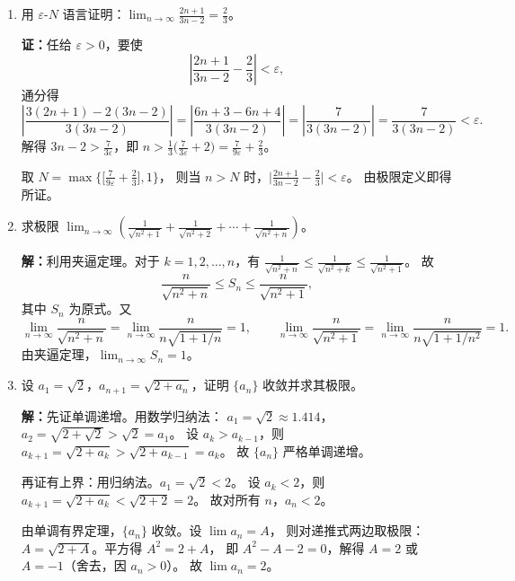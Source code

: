 \documentclass[12pt,a4paper]{ctexart}
\begin{document}
\begin{enumerate}[leftmargin=*,label=\arabic*.,start=4]
  \item 用 $\varepsilon$-$N$ 语言证明：$\displaystyle\lim_{n\to\infty}\frac{2n+1}{3n-2} = \frac{2}{3}$。

    \textbf{证：}任给 $\varepsilon > 0$，要使
    \[
    \left|\frac{2n+1}{3n-2} - \frac{2}{3}\right| < \varepsilon,
    \]
    通分得
    \[
    \left|\frac{3(2n+1) - 2(3n-2)}{3(3n-2)}\right|
    = \left|\frac{6n+3-6n+4}{3(3n-2)}\right|
    = \left|\frac{7}{3(3n-2)}\right|
    = \frac{7}{3(3n-2)} < \varepsilon.
    \]
    解得 $3n-2 > \frac{7}{3\varepsilon}$，即 $n > \frac{1}{3}\bigl(\frac{7}{3\varepsilon}+2\bigr)
    = \frac{7}{9\varepsilon} + \frac{2}{3}$。

    取 $N = \max\bigl\{\bigl[\frac{7}{9\varepsilon}+\frac{2}{3}\bigr], 1\bigr\}$，
    则当 $n > N$ 时，$\bigl|\frac{2n+1}{3n-2} - \frac{2}{3}\bigr| < \varepsilon$。
    由极限定义即得所证。

  \item 求极限 $\displaystyle\lim_{n\to\infty}\left(\frac{1}{\sqrt{n^2+1}} + \frac{1}{\sqrt{n^2+2}} + \cdots + \frac{1}{\sqrt{n^2+n}}\right)$。

    \textbf{解：}利用夹逼定理。对于 $k = 1,2,\dots,n$，有
    $\frac{1}{\sqrt{n^2+n}} \le \frac{1}{\sqrt{n^2+k}} \le \frac{1}{\sqrt{n^2+1}}$。
    故
    \[
    \frac{n}{\sqrt{n^2+n}} \le S_n \le \frac{n}{\sqrt{n^2+1}},
    \]
    其中 $S_n$ 为原式。又
    \[
    \lim_{n\to\infty}\frac{n}{\sqrt{n^2+n}} = \lim_{n\to\infty}\frac{n}{n\sqrt{1+1/n}} = 1,
    \qquad
    \lim_{n\to\infty}\frac{n}{\sqrt{n^2+1}} = \lim_{n\to\infty}\frac{n}{n\sqrt{1+1/n^2}} = 1.
    \]
    由夹逼定理，$\lim_{n\to\infty} S_n = 1$。

  \item 设 $a_1 = \sqrt{2}$，$a_{n+1} = \sqrt{2+a_n}$，证明 $\{a_n\}$ 收敛并求其极限。

    \textbf{解：}先证单调递增。用数学归纳法：
    $a_1 = \sqrt{2} \approx 1.414$，$a_2 = \sqrt{2+\sqrt{2}} > \sqrt{2} = a_1$。
    设 $a_k > a_{k-1}$，则 $a_{k+1} = \sqrt{2+a_k} > \sqrt{2+a_{k-1}} = a_k$。
    故 $\{a_n\}$ 严格单调递增。

    再证有上界：用归纳法。$a_1 = \sqrt{2} < 2$。
    设 $a_k < 2$，则 $a_{k+1} = \sqrt{2+a_k} < \sqrt{2+2} = 2$。
    故对所有 $n$，$a_n < 2$。

    由单调有界定理，$\{a_n\}$ 收敛。设 $\lim a_n = A$，
    则对递推式两边取极限：$A = \sqrt{2+A}$。平方得 $A^2 = 2 + A$，
    即 $A^2 - A - 2 = 0$，解得 $A = 2$ 或 $A = -1$（舍去，因 $a_n > 0$）。
    故 $\lim a_n = 2$。


\end{enumerate}
\end{document}
